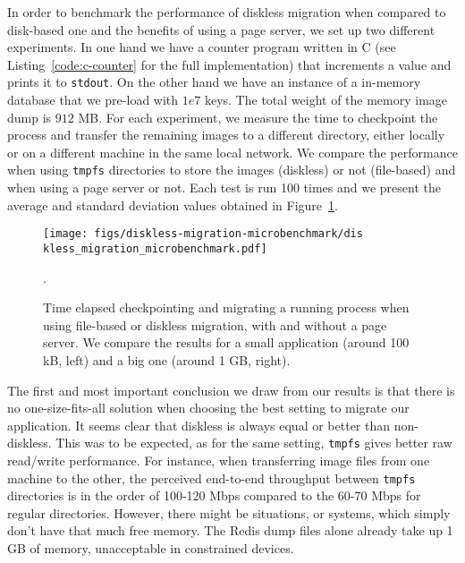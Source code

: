 In order to benchmark the performance of diskless migration when compared to
disk-based one and the benefits of using a page server, we set up two different
experiments.
In one hand we have a counter program written in C (see
Listing~\ref{code:c-counter} for the full implementation) that increments a
value and prints it to \texttt{stdout}.
On the other hand we have an instance of a \redis in-memory database that we
pre-load with $1e7$ keys.
The total weight of the memory image dump is $912$ MB.
For each experiment, we measure the time to checkpoint the process and transfer
the remaining images to a different directory, either locally or on a different
machine in the same local network.
We compare the performance when using \texttt{tmpfs} directories to store the
images (diskless) or not (file-based) and when using a page server or not.
Each test is run 100 times and we present the average and standard deviation
values obtained in Figure~\ref{fig:diskless-migration-microbenchmark}.

\begin{figure}[h!]
    \centering

    \texttt{[image: figs/diskless-migration-microbenchmark/dis
        kless\_migration\_microbenchmark.pdf]}
    \caption[Size of the memory image for iterative dumps.]{Time elapsed
        checkpointing and migrating a running process when using file-based or
        diskless
        migration, with and without a page server.
        We compare the results for a small application (around 100 kB, left) and a big
        one (around 1 GB, right).
        \label{fig:diskless-migration-microbenchmark}}.
\end{figure}

The first and most important conclusion we draw from our results is that there
is no one-size-fits-all solution when choosing the best setting to migrate our
application.
It seems clear that diskless is always equal or better than non-diskless.
This was to be expected, as for the same setting, \texttt{tmpfs} gives better
raw read/write performance.
For instance, when transferring image files from one machine to the other, the
perceived end-to-end throughput between \texttt{tmpfs} directories is in the
order of 100-120 Mbps compared to the 60-70 Mbps for regular directories.
However, there might be situations, or systems, which simply don't have that
much free memory.
The Redis dump files alone already take up 1 GB of memory, unacceptable in
constrained devices.

